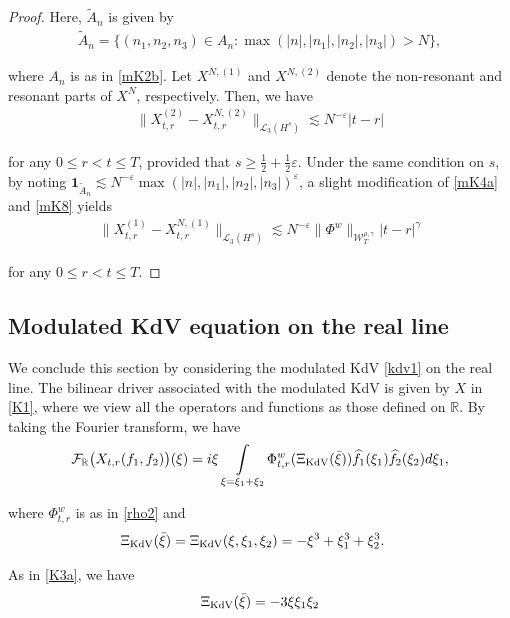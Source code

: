 \documentclass[letterpaper, 11pt,  reqno]{amsart}
\DeclareMathOperator*{\intt}{\int}
\newcommand{\1}{\hspace{0.5mm}\text{I}\hspace{0.5mm}}
\newcommand{\noi}{\noindent}
\newcommand{\R}{\mathbb{R}}
\newcommand{\F}{\mathcal{F}}
\newcommand{\eps}{\varepsilon}
\newcommand{\g}{\gamma}
\newcommand{\ft}{\widehat}
\newcommand{\wt}{\widetilde}
\newcommand{\les}{\lesssim}
\newcommand{\ind}{\mathbf 1}
\newcommand{\cL}{\mathcal{L}}
\newcommand{\W}{\mathcal{W}}
\newcommand{\KDV}{\text{\rm KdV} }
\numberwithin{equation}{section}
\numberwithin{theorem}{section}
\begin{document}
\begin{proof}
\noi
Here,  $\wt A_n$ is given by 
\begin{align*}
\wt A_n = 
\big\{(n_1, n_2,n_3)\in A_n : 
\max(|n|, |n_1|, |n_2|, |n_3|) > N\big\}, 
\end{align*}


\noi
where  $A_n$ is as in \eqref{mK2b}.
Let $X^{N, (1)}$ and $X^{N, (2)}$ denote the non-resonant and resonant 
parts of $X^N$, respectively.
Then, we have
\begin{align*}
\|X_{t,r}^{(2)}- X_{t,r}^{N, (2)} \|_{\cL_3 (H^s)}
\les N^{-\eps}
  |t-r| 
\end{align*}

\noi
for any $0 \le r <  t \le T$, 
provided that $s \ge \frac 12 + \frac 1 2\eps$.
Under the same condition on $s$, 
by noting $\ind_{\wt A_n} \les N^{-\eps} 
\max(|n|, |n_1|, |n_2|, |n_3|)^\eps$, 
a slight modification of \eqref{mK4a} and \eqref{mK8}
yields
\begin{align*}
\|X_{t,r}^{(1)}- X_{t,r}^{N, (1)} \|_{\cL_3 (H^s)}
\les N^{-\eps}
\| \Phi^w \|_{\W_T^{\rho,\g}}|t-r|^{\g}
\end{align*}

\noi
for any $0 \le r <  t \le T$.
\end{proof}





\subsection{Modulated KdV equation  on the real line}
\label{SUBSEC:K3}

We conclude this section by 
considering
 the  modulated KdV  \eqref{kdv1} on the real line.
The bilinear driver associated with the modulated KdV  is 
given by $X$ in \eqref{K1}, 
where we view all the operators and functions 
 as those defined on $\R$.
By taking the Fourier transform, we have
\begin{align}
\F_\R \big(X_{t,r} (f_1,f_2)\big) (\xi)
= i\xi \intt_{\xi = \xi_1 + \xi_2}
 \Phi^w_{t,r}(\Xi_\KDV (\bar \xi))
\ft f_1(\xi_1)  \ft f_2(\xi_2)d\xi_1,
\label{KR1}
\end{align}


\noi
where $\Phi^w_{t,r}$ is as in \eqref{rho2}
and 
\begin{align*}
\Xi_\KDV (\bar \xi) &  = \Xi_\KDV (\xi,\xi_1,\xi_2) 
= - \xi^3+ \xi_1^3 +\xi_2^3.
\end{align*}

\noi
As in \eqref{K3a}, 
 we have
\begin{align}
\Xi_\KDV (\bar \xi) = - 3\xi \xi_1 \xi_2
\label{KR1b}
\end{align}
\end{document}
